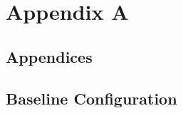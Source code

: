 \appendix
\chapter*{Appendix A}
\section*{Appendices} 


\setcounter{chapter}{1} %
\renewcommand{\thechapter}{A}
\renewcommand{\thesection}{\thechapter.\arabic{section}}
\setcounter{section}{0}
\section{Baseline Configuration}
